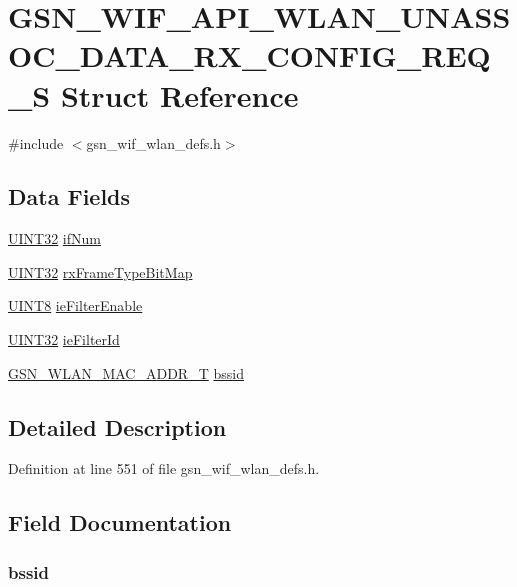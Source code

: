 \hypertarget{a00306}{
\section{GSN\_\-WIF\_\-API\_\-WLAN\_\-UNASSOC\_\-DATA\_\-RX\_\-CONFIG\_\-REQ\_\-S Struct Reference}
\label{a00306}
}


{\ttfamily \#include $<$gsn\_\-wif\_\-wlan\_\-defs.h$>$}

\subsection*{Data Fields}
\begin{DoxyCompactItemize}
\item 
\hyperlink{a00660_gae1e6edbbc26d6fbc71a90190d0266018}{UINT32} \hyperlink{a00306_ab582fd779b13f74e06e2491389a60aa0}{ifNum}
\item 
\hyperlink{a00660_gae1e6edbbc26d6fbc71a90190d0266018}{UINT32} \hyperlink{a00306_ac0490e36a56543f4ec855ae0c4aa9ea6}{rxFrameTypeBitMap}
\item 
\hyperlink{a00660_gab27e9918b538ce9d8ca692479b375b6a}{UINT8} \hyperlink{a00306_ad3af938294b97ba2d7745f480ded0549}{ieFilterEnable}
\item 
\hyperlink{a00660_gae1e6edbbc26d6fbc71a90190d0266018}{UINT32} \hyperlink{a00306_a2554f445e1b1649a7e321eaa2de071a7}{ieFilterId}
\item 
\hyperlink{a00416}{GSN\_\-WLAN\_\-MAC\_\-ADDR\_\-T} \hyperlink{a00306_a1d70c2c8895c2763bdede85266c38318}{bssid}
\end{DoxyCompactItemize}


\subsection{Detailed Description}


Definition at line 551 of file gsn\_\-wif\_\-wlan\_\-defs.h.



\subsection{Field Documentation}
\hypertarget{a00306_a1d70c2c8895c2763bdede85266c38318}{
\subsubsection[{bssid}]{ {\bf bssid}}}
\label{a00306_a1d70c2c8895c2763bdede85266c38318}



